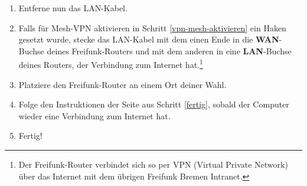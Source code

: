 \documentclass{article}
\begin{document}
\begin{enumerate}
\item Entferne nun das LAN-Kabel.


%

\item Falls für \glqq{}Mesh-VPN aktivieren\grqq{} in Schritt \ref{vpn-mesh-aktivieren} ein Haken gesetzt wurde, stecke das LAN-Kabel mit dem einen Ende in die \textbf{WAN}-Buchse deines Freifunk-Routers und mit dem anderen in eine \textbf{LAN}-Buchse deines Routers, der Verbindung zum Internet hat.\footnote{Der Freifunk-Router verbindet sich so per VPN (Virtual Private Network) über das Internet mit dem übrigen Freifunk Bremen Intranet.}

\item Platziere den Freifunk-Router an einem Ort deiner Wahl. \label{platzieren}

%

\item Folge den Instruktionen der Seite aus Schritt \ref{fertig}, sobald der Computer wieder eine Verbindung zum Internet hat.

\item Fertig!
\end{enumerate}
\end{document}
